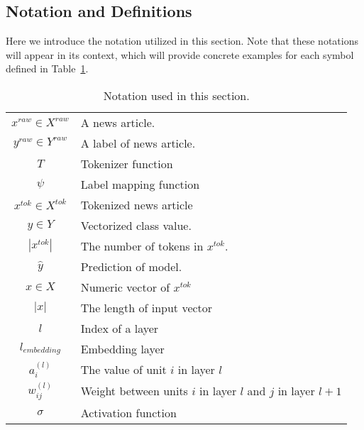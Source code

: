 \subsection{Notation and Definitions}
\label{subsec:newsContentModels_Definitions}
Here we introduce the notation utilized in this section. Note that these notations will appear in its context, which will provide concrete examples for each symbol defined in Table~\ref{tab:newsContentModels_Notation}.\\
\begin{table}
    \begin{tabular}{cp{}}
        $x^{raw} \in X^{raw}$ & A news article.                                              \\
        $y^{raw} \in Y^{raw}$ & A label of news article.                                     \\
        $T$                   & Tokenizer function                                           \\
        $\psi$                & Label mapping function                                       \\
        $x^{tok} \in X^{tok}$ & Tokenized news article                                       \\
        $y \in Y$             & Vectorized class value.                                      \\
        $|x^{tok}|$           & The number of tokens in $x^{tok}$.                           \\
        $\hat{y}$             & Prediction of model.                                         \\
        $x \in X$             & Numeric vector of $x^{tok}$                                  \\
        $|x|$                 & The length of input vector                                   \\
        $l$                   & Index of a layer                                             \\
        $l_{embedding}$       & Embedding layer                                              \\
        $a_{i}^{(l)}$         & The value of unit $i$ in layer $l$                           \\
        $w_{ij}^{(l)}$        & Weight between units $i$ in layer $l$ and $j$ in layer $l+1$ \\
        $\sigma$              & Activation function                                          \\
    \end{tabular}
    \caption[Notation]{Notation used in this section.}
    \label{tab:newsContentModels_Notation}
\end{table}
